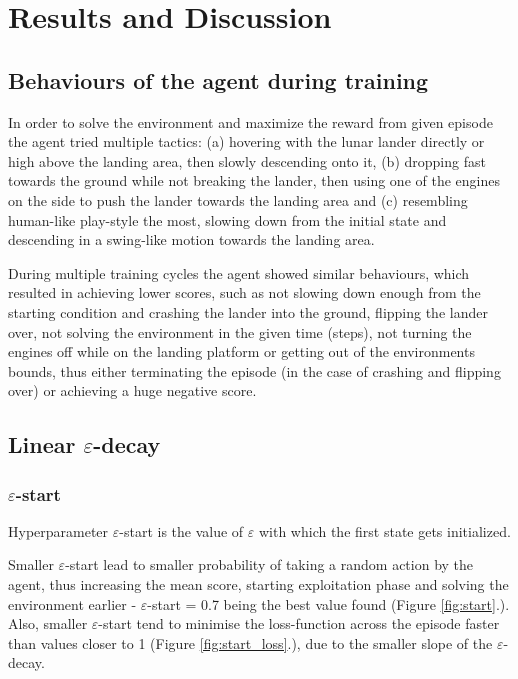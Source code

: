 \documentclass{article}
\begin{document}

\section{Results and Discussion}

\subsection*{Behaviours of the agent during training}
In order to solve the environment and maximize the reward from given episode the agent tried multiple tactics: (a) hovering with the lunar lander directly or high above the landing area, then slowly descending onto it, (b) dropping fast towards the ground while not breaking the lander, then using one of the engines on the side to push the lander towards the landing area and (c) resembling human-like play-style the most, slowing down from the initial state and descending in a swing-like motion towards the landing area.

During multiple training cycles the agent showed similar behaviours, which resulted in achieving lower scores, such as not slowing down enough from the starting condition and crashing the lander into the ground, flipping the lander over, not solving the environment in the given time (steps), not turning the engines off while on the landing platform or getting out of the environments bounds, thus either terminating the episode (in the case of crashing and flipping over) or achieving a huge negative score.

\newpage
\subsection*{Linear $\varepsilon$-decay}

\subsubsection*{$\varepsilon$-start}
Hyperparameter $\varepsilon$-start is the value of $\varepsilon$ with which the first state gets initialized.

Smaller $\varepsilon$-start lead to smaller probability of taking a random action by the agent, thus increasing the mean score, starting exploitation phase and solving the environment earlier - $\varepsilon$-start = 0.7 being the best value found (Figure \ref{fig:start}.). Also, smaller $\varepsilon$-start tend to minimise the loss-function across the episode faster than values closer to 1 (Figure \ref{fig:start_loss}.), due to the smaller slope of the $\varepsilon$-decay.
\end{document}
